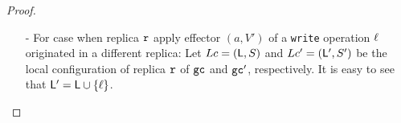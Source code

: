 \begin {proof}
\begin{itemize}

    Given operations $\alabel_1$ and $\alabel_2$, such that $(b_1,V_1)$ and $(b_2,V_2)$ is the effector of $\alabel_1$ and $\alabel_2$, respectively. Given replica $\arep_1$, let $S_{b1}$ (resp., $S_{b2}$) be the set of {\tt write} operations $\alabel'$ happen on replica $\arep_1$, and either $\alabel'$ is visible to $\alabel_1$, or $\alabel' = \alabel_1$ (resp., and either $\alabel'$ is visible to $\alabel_2$, or $\alabel' = \alabel_2$). By the causal delivery assumption, the visibility relation is transitive. By Annotation1 of $(b_1,V_1)$ and $(b_2,V_2)$, we can see that, $( S_{b1} \subseteq S_{b2} ) \vee ( S_{b2} \subseteq S_{b1} )$. %

    Let $\mathcal{V} = \{ V \vert (\_,V) \in S \}$ be the set of vector clocks of $S$. By Annotation2 of local configuration $Lc$ and Annotation1 of effectors of $S$,
    we can see that, for each replica $\arep' \neq \arep$, $max_{V \in \mathcal{V}} V[\arep']$ is the number of {\tt write} operations happen on replica $\arep'$ and is in $\alabelset$, %
    and $max_{V \in \mathcal{V}} V[\arep]$ is the number of operations happen on replica $\arep$ and is in $\alabelset$. %
    Then, for each replica $\arep' \neq \arep$, $V'[\arep'] = max_{V \in \mathcal{V}} V[\arep']$, and $V'[\arep] = max_{V \in \mathcal{V}} V[\arep] +1$. Therefore, Annotation1 still holds for the effector $(a,V')$. %

\item[-] For case when replica $\arep$ apply effector $(a,V')$ of a {\tt write} operation $\ell$ originated in a different replica: Let $Lc = (\mathsf{L},S)$ and $Lc' = (\mathsf{L}',S')$ be the local configuration of replica $\arep$ of $\mathtt{gc}$ and $\mathtt{gc}'$, respectively. It is easy to see that $\mathsf{L}' = \mathsf{L} \cup \{ \ell \}$. %


\end{itemize}
\end{proof}
